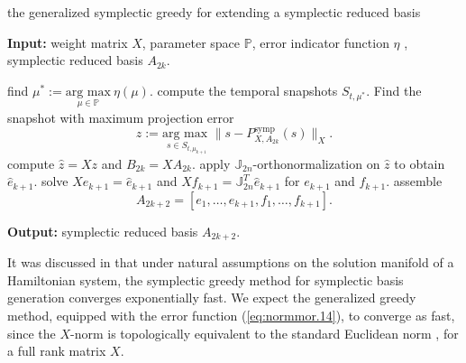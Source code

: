 \begin{algorithm} 
	\caption{the generalized symplectic greedy for extending a symplectic reduced basis} \label{alg:5.1}
	\textbf{Input:} weight matrix $X$, parameter space $\mathbb P$, error indicator function $\eta$ , symplectic reduced basis $A_{2k}$.
	\begin{algorithmic} [1]
		\State find $\mu^* := \underset{\mu \in \mathbb P}{\text{arg\ max}} \ \eta(\mu)$.
		\State compute the temporal snapshots $S_{t,\mu^*}$.
		\State Find the snapshot with maximum projection error
		\[
			z := \underset{s\in S_{t,\mu_{k+1}}}{\text{arg\ max }} \| s - P_{X,A_{2k}}^{\text{symp}}(s) \|_X.
		\]
		\State compute $\hat z = Xz$ and $B_{2k} = X A_{2k}$.
		\State apply $\mathbb J_{2n}$-orthonormalization on $\hat z$ to obtain $\hat e_{k+1}$.
		\State solve $X e_{k+1} = \hat e_{k+1}$ and $X f_{k+1} = \mathbb J_{2n}^T  \hat e_{k+1}$ for $e_{k+1}$ and $f_{k+1}$.
		\State assemble
		\[
			A_{2k+2}=[e_1,\dots,e_{k+1},f_1,\dots,f_{k+1}].
		\]
	\end{algorithmic}
	\vspace{0.5cm}
	\textbf{Output:} symplectic reduced basis $A_{2k+2}$.
\end{algorithm}


It was discussed in  that under natural assumptions on the solution manifold of a Hamiltonian system, the symplectic greedy method for symplectic basis generation converges exponentially fast. We expect the generalized greedy method, equipped with the error function (\ref{eq:normmor.14}), to converge as fast, since the $X$-norm is topologically equivalent to the standard Euclidean norm \cite{friedman1970foundations}, for a full rank matrix $X$.

